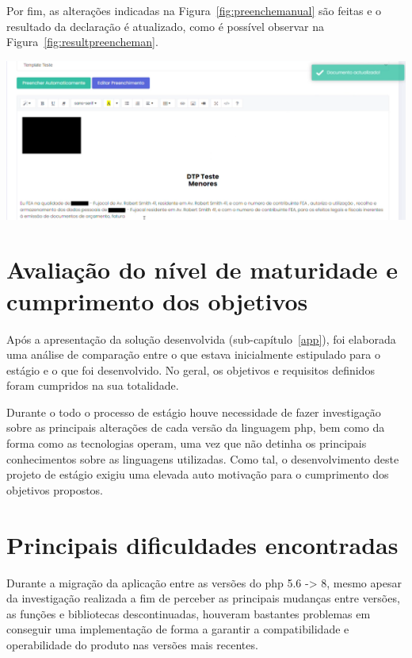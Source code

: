 Por fim, as alterações indicadas na Figura~\ref{fig:preenchemanual} são feitas e o resultado da declaração é atualizado, como é possível observar na Figura~\ref{fig:resultpreencheman}.

\begin{center}
        \includegraphics[width=\textwidth,height=\textheight,keepaspectratio]{images/resultpreencheman.png}
        \label{fig:resultpreencheman}
\end{center}

\section{Avaliação do nível de maturidade e cumprimento dos objetivos}

Após a apresentação da solução desenvolvida (sub-capítulo~\ref{app}), foi elaborada uma análise de comparação entre o que estava inicialmente estipulado para o estágio e o que foi desenvolvido. No geral, os objetivos e requisitos definidos foram cumpridos na sua totalidade.

Durante o todo o processo de estágio houve necessidade de fazer investigação sobre as principais alterações de cada versão da linguagem \acrshort{php}, bem como da forma como as tecnologias operam, uma vez que não detinha os principais conhecimentos sobre as linguagens utilizadas. Como tal, o desenvolvimento deste projeto de estágio exigiu uma elevada auto motivação para o cumprimento dos objetivos propostos.


\section{Principais dificuldades encontradas}

Durante a migração da aplicação entre as versões do \acrshort{php} 5.6 -> 8, mesmo apesar da investigação realizada a fim de perceber as principais mudanças entre versões, as funções e bibliotecas descontinuadas, houveram bastantes problemas em conseguir uma implementação de forma a garantir a compatibilidade e operabilidade do produto nas versões mais recentes.

